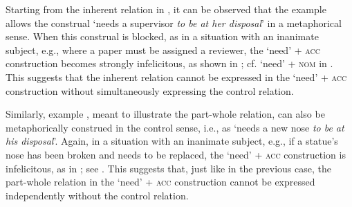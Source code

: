 \documentclass[output=paper,colorlinks,citecolor=brown]{langscibook}
\begin{document}
\ea
{}
\z\z

\noindent Starting from the inherent relation in , it can be observed that the example allows the construal `needs a supervisor \textit{to be at her disposal}' in a metaphorical sense. When this construal is blocked, as in a situation with an inanimate subject, e.g., where a paper must be assigned a reviewer, the `need' + \textsc{acc} construction becomes strongly infelicitous, as shown in ; cf. `need' + \textsc{nom} in . This suggests that the inherent relation cannot be expressed in the `need' + \textsc{acc} construction without simultaneously expressing the control relation.

\ea \label{inherent-inan-context}
\z\z

\noindent Similarly, example , meant to illustrate the part-whole relation, can also be metaphorically construed in the control sense, i.e., as `needs a new nose \textit{to be at his disposal}'. Again, in a situation with an inanimate subject, e.g., if a statue's nose has been broken and needs to be replaced, the `need' + \textsc{acc} construction is infelicitous, as in ; see . This suggests that, just like in the previous case, the part-whole relation in the `need' + \textsc{acc} construction cannot be expressed independently without the control relation.
\end{document}

